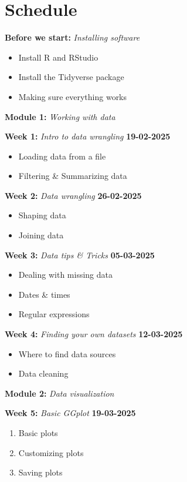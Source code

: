 \documentclass{article}
\newcommand{\week}[3]{
    \begin{center}
        \textbf{#1:} \textit{#2} \dotfill \textbf{#3}
    \end{center}
}
\newcommand{\module}[2]{
    \vspace{2em}
    \large
    \textbf{#1:} \textit{#2}
    \normalsize
}
\begin{document}
\section*{Schedule}

\module{Before we start}{Installing software}
\begin{itemize}
    \item Install R and RStudio
    \item Install the Tidyverse package
    \item Making sure everything works
\end{itemize}

\module{Module 1}{Working with data}

\week{Week 1}{Intro to data wrangling}{19-02-2025}
\begin{itemize}
    \item Loading data from a file
    \item Filtering \& Summarizing data
\end{itemize}

\week{Week 2}{Data wrangling}{26-02-2025}
\begin{itemize}
    \item Shaping data
    \item Joining data
\end{itemize}

\week{Week 3}{Data tips \& Tricks}{05-03-2025}
\begin{itemize}
    \item Dealing with missing data
    \item Dates \& times
    \item Regular expressions
\end{itemize}

\week{Week 4}{Finding your own datasets}{12-03-2025}
\begin{itemize}
    \item Where to find data sources
    \item Data cleaning
\end{itemize}

\module{Module 2}{Data visualization}

\week{Week 5}{Basic GGplot}{19-03-2025}
\begin{enumerate}
    \item Basic plots
    \item Customizing plots
    \item Saving plots
\end{enumerate}
\end{document}
